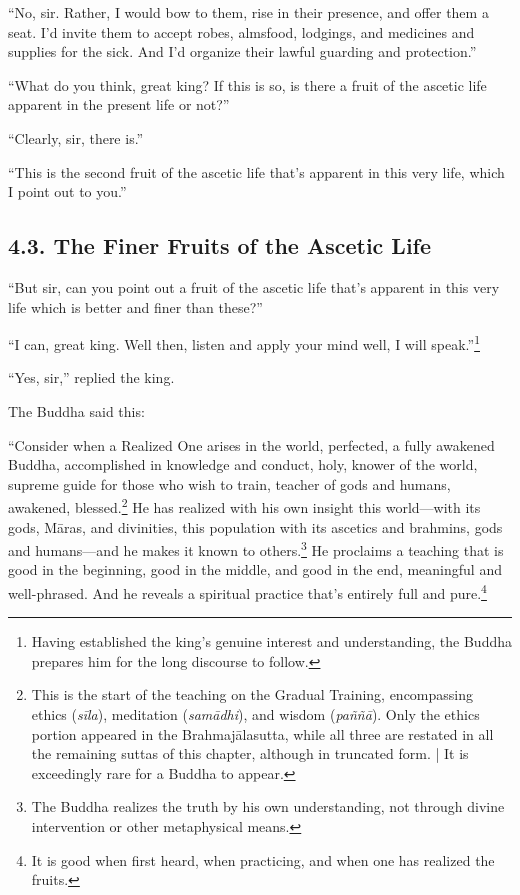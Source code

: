\documentclass[12pt,openany]{book}%
\begin{document}
“No, sir. Rather, I would bow to them, rise in their presence, and offer them a seat. I’d invite them to accept robes, almsfood, lodgings, and medicines and supplies for the sick. And I’d organize their lawful guarding and protection.” 

“What do you think, great king? If this is so, is there a fruit of the ascetic life apparent in the present life or not?” 

“Clearly, sir, there is.” 

“This is the second fruit of the ascetic life that’s apparent in this very life, which I point out to you.” 

\subsection*{4.3. The Finer Fruits of the Ascetic Life }

“But sir, can you point out a fruit of the ascetic life that’s apparent in this very life which is better and finer than these?” 

“I can, great king. Well then, listen and apply your mind well, I will speak.”\footnote{Having established the king’s genuine interest and understanding, the Buddha prepares him for the long discourse to follow. } 

“Yes, sir,” replied the king. 

The Buddha said this: 

“Consider when a Realized One arises in the world, perfected, a fully awakened Buddha, accomplished in knowledge and conduct, holy, knower of the world, supreme guide for those who wish to train, teacher of gods and humans, awakened, blessed.\footnote{This is the start of the teaching on the Gradual Training, encompassing ethics (\textit{\textsanskrit{sīla}}), meditation (\textit{\textsanskrit{samādhi}}), and wisdom (\textit{\textsanskrit{paññā}}). Only the ethics portion appeared in the \textsanskrit{Brahmajālasutta}, while all three are restated in all the remaining suttas of this chapter, although in truncated form. | It is exceedingly rare for a Buddha to appear. } He has realized with his own insight this world—with its gods, \textsanskrit{Māras}, and divinities, this population with its ascetics and brahmins, gods and humans—and he makes it known to others.\footnote{The Buddha realizes the truth by his own understanding, not through divine intervention or other metaphysical means. } He proclaims a teaching that is good in the beginning, good in the middle, and good in the end, meaningful and well-phrased. And he reveals a spiritual practice that’s entirely full and pure.\footnote{It is good when first heard, when practicing, and when one has realized the fruits. } 
\end{document}
